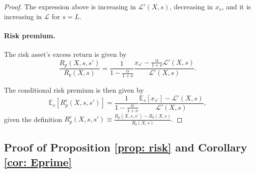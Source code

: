 \begin{proof}
The expression above is increasing in $\mathcal{L}'(X,s)$, decreasing in $x_s$, and it is increasing in $\mathcal{L}$ for $s = L$.

\paragraph{Risk premium.} The risk asset's excess return is given by
\begin{equation}
    \frac{R_p(X,s,s')}{R_b(X,s)} = \frac{1}{1-\frac{\alpha}{1+\nu}} \frac{x_{s'} - \frac{\alpha}{1+\nu} \mathcal{L}'(X,s)}{\mathcal{L}'(X,s)}.
\end{equation}

The conditional risk premium is then given by
\begin{equation}
    \mathbb{E}_s[R_{p}^e(X,s,s')] = 
     \frac{1}{1-\frac{\alpha}{1+\nu}} \frac{\mathbb{E}_s[x_{s'}] -\mathcal{L}'(X,s)}{\mathcal{L}'(X,s)},
\end{equation}
given the definition $R_p^e(X,s,s') \equiv \frac{R_p(X,s,s') - R_b(X,s)}{R_b(X,s)}$.

\end{proof}

\subsection{Proof of Proposition \ref{prop: risk} and Corollary \ref{cor: Eprime}}\label{app: proof_risk}

